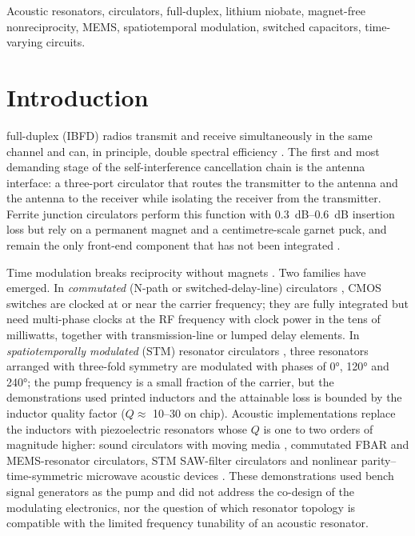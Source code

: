 \documentclass[journal]{IEEEtran}
\begin{document}
\begin{IEEEkeywords}
Acoustic resonators, circulators, full-duplex, lithium niobate, magnet-free nonreciprocity, MEMS, spatiotemporal modulation, switched capacitors, time-varying circuits.
\end{IEEEkeywords}

\IEEEpeerreviewmaketitle

\section{Introduction}
 full-duplex (IBFD) radios transmit and receive simultaneously in the same channel and can, in principle, double spectral efficiency \cite{sabharwal2014inband,bharadia2013full,zhou2017integrated}. The first and most demanding stage of the self-interference cancellation chain is the antenna interface: a three-port circulator that routes the transmitter to the antenna and the antenna to the receiver while isolating the receiver from the transmitter. Ferrite junction circulators perform this function with \SIrange{0.3}{0.6}{dB} insertion loss but rely on a permanent magnet and a centimetre-scale garnet puck, and remain the only front-end component that has not been integrated \cite{kord2020microwave,caloz2018electromagnetic}.

Time modulation breaks reciprocity without magnets \cite{sounas2017nonreciprocal,nagulu2020nonreciprocal}. Two families have emerged. In \emph{commutated} (N-path or switched-delay-line) circulators \cite{reiskarimian2016magnetic,reiskarimian2017cmos,dinc2017synchronized,dinc2017millimeter,nagulu2019nonmagnetic,biedka2017ultra}, CMOS switches are clocked at or near the carrier frequency; they are fully integrated but need multi-phase clocks at the RF frequency with clock power in the tens of milliwatts, together with transmission-line or lumped delay elements. In \emph{spatiotemporally modulated} (STM) resonator circulators \cite{sounas2013giant,estep2014magnetic,kord2018magnetless,kord2018pseudo,kord2018broadband,kord2019magnetless,qin2014nonreciprocal}, three resonators arranged with three-fold symmetry are modulated with phases of \ang{0}, \ang{120} and \ang{240}; the pump frequency is a small fraction of the carrier, but the demonstrations used printed inductors and the attainable loss is bounded by the inductor quality factor ($Q\!\approx$ 10--30 on chip). Acoustic implementations replace the inductors with piezoelectric resonators whose $Q$ is one to two orders of magnitude higher: sound circulators with moving media \cite{fleury2014sound,fleury2015subwavelength}, commutated FBAR \cite{torunbalci2018fbar} and MEMS-resonator \cite{yu2018magnetic,yu2019highly} circulators, STM SAW-filter circulators \cite{yu2019radio} and nonlinear parity--time-symmetric microwave acoustic devices \cite{shao2020nonreciprocal}. These demonstrations used bench signal generators as the pump and did not address the co-design of the modulating electronics, nor the question of which resonator topology is compatible with the limited frequency tunability of an acoustic resonator.
\end{document}
